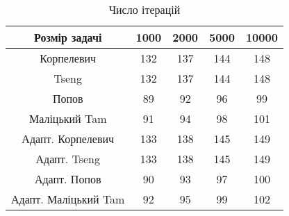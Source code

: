 \begin{table}[H]
	\centering
	\begin{tabular}{|c||c|c|c|c|}\hline
		Розмір задачі & 1000 & 2000 & 5000 & 10000 \\ \hline \hline
		Корпелевич & 132 & 137 & 144 & 148 \\ \hline
		Tseng & 132 & 137 & 144 & 148 \\ \hline
		Попов & 89 & 92 & 96 & 99 \\ \hline
		Маліцький Tam & 91 & 94 & 98 & 101 \\ \hline \hline
		Адапт. Корпелевич & 133 & 138 & 145 & 149 \\ \hline
		Адапт. Tseng & 133 & 138 & 145 & 149 \\ \hline
		Адапт. Попов & 90 & 93 & 97 & 100 \\ \hline
		Адапт. Маліцький Tam & 92 & 95 & 99 & 102 \\ \hline
	\end{tabular}
	\caption{Число ітерацій}
\end{table}
